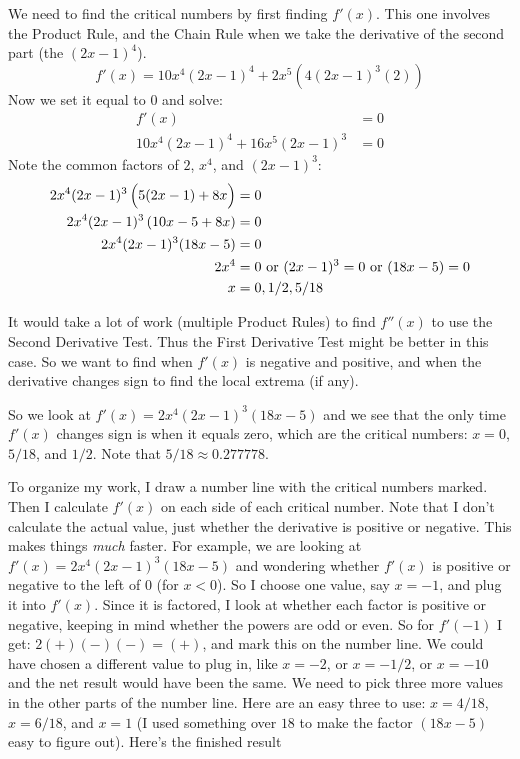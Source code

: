 \documentclass[oneside]{book}
\newcommand{\BigParens}[1]
{\left(\raisebox{0in}[1.25\height]{$#1$}\right)}
\theoremstyle{definition}
\theoremstyle{solution}
\newtheorem*{solution}{Solution}
\newenvironment{solution}{\vspace{2in}\comment}{\endcomment}
\begin{document}
\begin{solution}
  We need to find the critical numbers by first finding $f'(x)$.  This
  one involves the Product Rule, and the Chain Rule when we take the
  derivative of the second part (the $(2x-1)^4$).
  $$
  f'(x)  = 10x^4(2x-1)^4 + 2x^5\left(4(2x-1)^3(2)\right)
  $$
  Now we set it equal to $0$ and solve:
  \begin{align*}
    f'(x) & = 0\\
    10x^4(2x-1)^4 + 16x^5(2x-1)^3& = 0
  \end{align*}
  Note the common factors of $2$, $x^4$, and $(2x-1)^3$:
  \begin{align*}
    2x^4(2x-1)^3 \BigParens{5(2x-1) + 8x} & = 0\\
    2x^4(2x-1)^3 \BigParens{10x-5+8x} & = 0\\
    2x^4(2x-1)^3(18x-5)& = 0\\
    2x^4 & = 0\text{ or }(2x-1)^3 =0 \text{ or }(18x-5) = 0\\
    x & = 0, 1/2, 5/18
  \end{align*}
  
  It would take a lot of work (multiple Product Rules) to
  find $f''(x)$ to use the Second Derivative Test.  Thus the First
  Derivative Test might be better in this case. So we want to find
  when $f'(x)$ is negative and positive, and when the derivative
  changes sign to find the local extrema (if any).
  
  So we look at $f'(x) = 2x^4(2x-1)^3(18x-5)$ and we see that the only
  time $f'(x)$ changes sign is when it equals zero, which are the
  critical numbers: $x = 0$, $5/18$, and $1/2$. Note that
  $5/18 \approx 0.277778$.
  
  To organize my work, I draw a number line with the critical numbers
  marked.  Then I calculate $f'(x)$ on each side of each critical
  number.  Note that I don't calculate the actual value, just whether
  the derivative is positive or negative.  This makes things
  \emph{much} faster.  For example, we are looking at
  $f'(x) = 2x^4(2x-1)^3(18x-5)$ and wondering whether $f'(x)$ is
  positive or negative to the left of $0$ (for $x < 0$).  So I choose
  one value, say $x = -1$, and plug it into $f'(x)$.  Since it is
  factored, I look at whether each factor is positive or negative,
  keeping in mind whether the powers are odd or even.  So for $f'(-1)$
  I get: $2(+)(-)(-) = (+)$, and mark this on the number line.  We
  could have chosen a different value to plug in, like $x=-2$, or
  $x=-1/2$, or $x=-10$ and the net result would have been the same.
  We need to pick three more values in the other parts of the number
  line.  Here are an easy three to use: $x=4/18$, $x=6/18$, and $x=1$
  (I used something over $18$ to make the factor $(18x-5)$ easy to
  figure out).  Here's the finished result
  \begin{center}
\end{center}
\end{solution}
\end{document}
